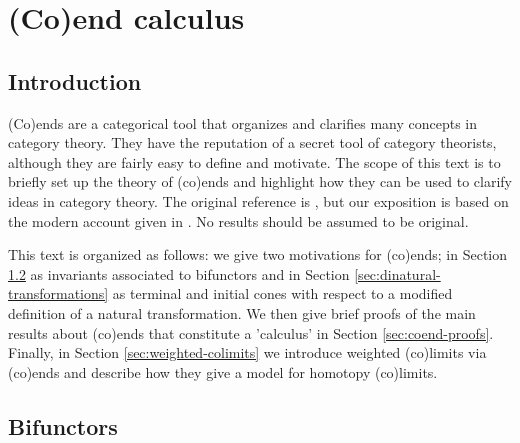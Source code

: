 \chapter{(Co)end calculus}
\section{Introduction}
(Co)ends are a categorical tool that organizes and clarifies many concepts in category theory. They have the reputation of a secret tool of category theorists, although they are fairly easy to define and motivate. The scope of this text is to briefly set up the theory of (co)ends and highlight how they can be used to clarify ideas in category theory. The original reference is \cite{Yoneda60}, but our exposition is based on the modern account given in \cite{Loregian21}. No results should be assumed to be original.

This text is organized as follows: we give two motivations for (co)ends; in Section \ref{sec:bifunctor} as invariants associated to bifunctors and in Section \ref{sec:dinatural-transformations} as terminal and initial cones with respect to a modified definition of a natural transformation. We then give brief proofs of the main results about (co)ends that constitute a 'calculus' in Section \ref{sec:coend-proofs}. Finally, in Section \ref{sec:weighted-colimits} we introduce weighted (co)limits via (co)ends and describe how they give a model for homotopy (co)limits.

\section{Bifunctors}\label{sec:bifunctor}

